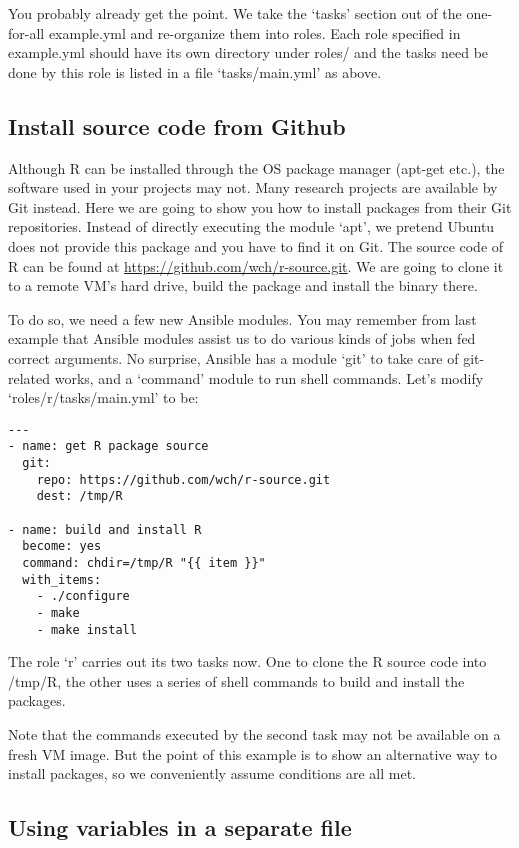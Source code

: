 You probably already get the point. We take the `tasks' section out of
the one-for-all example.yml and re-organize them into roles. Each role
specified in example.yml should have its own directory under roles/ and
the tasks need be done by this role is listed in a file `tasks/main.yml'
as above.

\subsection{Install source code from
Github}\label{install-source-code-from-github}

Although R can be installed through the OS package manager (apt-get
etc.), the software used in your projects may not. Many research
projects are available by Git instead. Here we are going to show you how
to install packages from their Git repositories. Instead of directly
executing the module `apt', we pretend Ubuntu does not provide this
package and you have to find it on Git. The source code of R can be
found at \url{https://github.com/wch/r-source.git}. We are going to
clone it to a remote VM's hard drive, build the package and install the
binary there.

To do so, we need a few new Ansible modules. You may remember from last
example that Ansible modules assist us to do various kinds of jobs when
fed correct arguments. No surprise, Ansible has a module `git' to take
care of git-related works, and a `command' module to run shell commands.
Let's modify `roles/r/tasks/main.yml' to be:

\begin{verbatim}
---
- name: get R package source
  git:
    repo: https://github.com/wch/r-source.git
    dest: /tmp/R

- name: build and install R
  become: yes
  command: chdir=/tmp/R "{{ item }}"
  with_items:
    - ./configure
    - make
    - make install
\end{verbatim}

The role `r' carries out its two tasks now. One to clone the R source
code into /tmp/R, the other uses a series of shell commands to build and
install the packages.

Note that the commands executed by the second task may not be available
on a fresh VM image. But the point of this example is to show an
alternative way to install packages, so we conveniently assume
conditions are all met.

\subsection{Using variables in a separate
file}\label{using-variables-in-a-separate-file}

